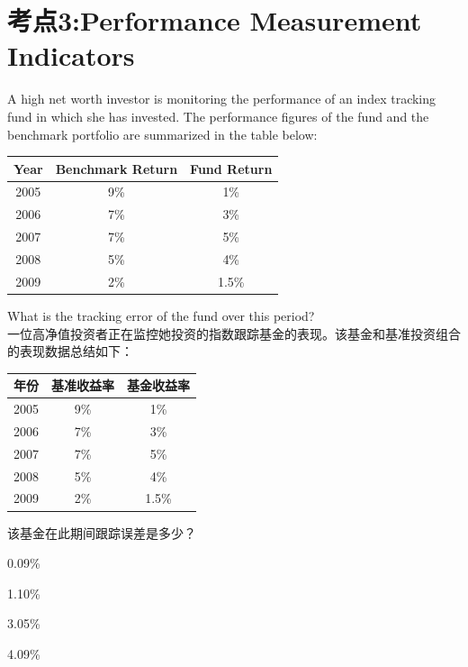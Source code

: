 \documentclass{article}
\newcounter{question} %
\begin{document}
\section{考点3:Performance Measurement Indicators}
\setcounter{question}{0}
\begin{question}
    A high net worth investor is monitoring the performance of an index tracking fund in which she has invested. The performance figures of the fund and the benchmark portfolio are summarized in the table below:
   
\begin{table}[H]
    \centering
    \begin{tabular}{|c|c|c|}
        \hline
        Year & Benchmark Return & Fund Return \\
        \hline
        2005 & 9\% & 1\% \\
        2006 & 7\% & 3\% \\
        2007 & 7\% & 5\% \\
        2008 & 5\% & 4\% \\
        2009 & 2\% & 1.5\% \\
        \hline
    \end{tabular}
\end{table}

What is the tracking error of the fund over this period?
\\一位高净值投资者正在监控她投资的指数跟踪基金的表现。该基金和基准投资组合的表现数据总结如下：
   
\begin{table}[H]
    \centering
    \begin{tabular}{|c|c|c|}
        \hline
        年份 & 基准收益率 & 基金收益率 \\
        \hline
        2005 & 9\% & 1\% \\
        2006 & 7\% & 3\% \\
        2007 & 7\% & 5\% \\
        2008 & 5\% & 4\% \\
        2009 & 2\% & 1.5\% \\
        \hline
    \end{tabular}
\end{table}

该基金在此期间跟踪误差是多少？
\end{question}


\begin{choices}
    \item 0.09\%
    \item 1.10\%
    \item 3.05\%
    \item 4.09\%
\end{choices}
\end{document}
